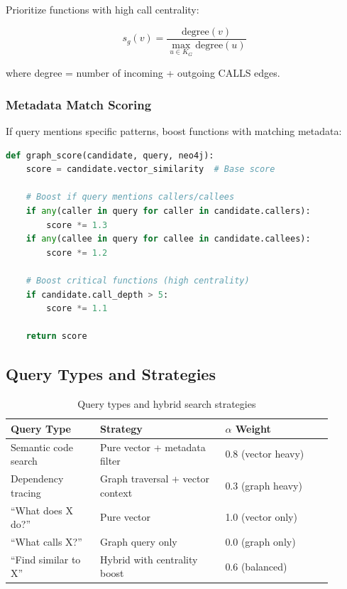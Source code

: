 \documentclass[11pt,letterpaper]{article}
\begin{document}
Prioritize functions with high call centrality:

\begin{equation}
s_g(v) = \frac{\text{degree}(v)}{\max_{u \in K_G} \text{degree}(u)}
\end{equation}

where degree = number of incoming + outgoing CALLS edges.

\subsubsection{Metadata Match Scoring}

If query mentions specific patterns, boost functions with matching metadata:

\begin{lstlisting}[language=Python, caption=Metadata match scoring]
def graph_score(candidate, query, neo4j):
    score = candidate.vector_similarity  # Base score
    
    # Boost if query mentions callers/callees
    if any(caller in query for caller in candidate.callers):
        score *= 1.3
    if any(callee in query for callee in candidate.callees):
        score *= 1.2
    
    # Boost critical functions (high centrality)
    if candidate.call_depth > 5:
        score *= 1.1
    
    return score
\end{lstlisting}

\subsection{Query Types and Strategies}

\begin{table}[h]
\centering
\caption{Query types and hybrid search strategies}
\begin{tabular}{@{}p{0.25\linewidth}p{0.35\linewidth}p{0.3\linewidth}@{}}
\toprule
\textbf{Query Type} & \textbf{Strategy} & \textbf{$\alpha$ Weight} \\
\midrule
Semantic code search & Pure vector + metadata filter & 0.8 (vector heavy) \\
Dependency tracing & Graph traversal + vector context & 0.3 (graph heavy) \\
``What does X do?'' & Pure vector & 1.0 (vector only) \\
``What calls X?'' & Graph query only & 0.0 (graph only) \\
``Find similar to X'' & Hybrid with centrality boost & 0.6 (balanced) \\
\bottomrule
\end{tabular}
\label{tab:query-strategies}
\end{table}
\end{document}
